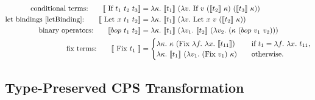\documentclass[10pt]{article}
\begin{document}
\begin{align*}
        \text{conditional terms:\quad \quad } \llbracket \text{ If } t_1 \text{ } t_2 \text{ }t_3 \rrbracket & = \lambda \kappa.\text{ }\llbracket t_1 \rrbracket \text{ }(\lambda v.\text{ If } v \text{ }(\llbracket t_2 \rrbracket \text{ }\kappa)\text{ }(\llbracket t_3 \rrbracket \text{ }\kappa))\\
        \text{let bindings \cite{letBinding}:\quad \quad }\llbracket \text{ Let } x\text{ }t_1 \text{ } t_2 \rrbracket & = \lambda \kappa.\text{ }\llbracket t_1 \rrbracket \text{ }(\lambda v.\text{ Let } x \text{ }v\text{ }(\llbracket t_2 \rrbracket \text{ }\kappa))\\
        \text{binary operators:\quad \quad }\llbracket bop\text{ }t_1 \text{ }t_2 \rrbracket &= \lambda \kappa.\text{ }\llbracket t_1 \rrbracket \text{ }(\lambda v_1.\text{ }\llbracket t_2 \rrbracket \text{ }(\lambda v_2.\text{ }(\kappa\text{ }(bop\text{ }v_1\text{ }v_2)))\\                                                                   
        \text{fix terms:\quad \quad }\llbracket \text{ Fix } t_1\text{ }\rrbracket &= \begin{cases}
                                                                                        \lambda \kappa.\text{ }\kappa\text{ }(\text{Fix }\lambda f.\text{ }\lambda x.\text{ }\llbracket t_{11} \rrbracket) &\text{\quad if } t_1 = \lambda f.\text{ }\lambda x.\text{ }t_{11},\\
                                                                                        \lambda \kappa.\text{ }\llbracket t_1 \rrbracket \text{ }(\lambda v_1.\text{ }(\text{Fix } v_1)\text{ }\kappa) &\text{\quad otherwise.}
                                                                                      \end{cases}
\end{align*}

\subsection{Type-Preserved CPS Transformation}
\end{document}

